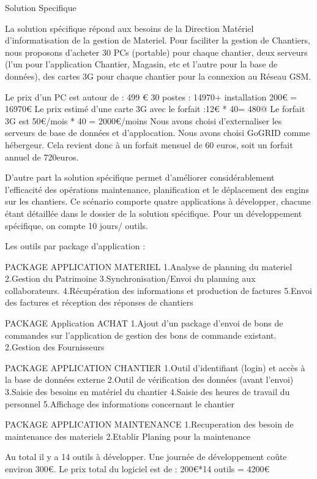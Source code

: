 Solution Specifique

La solution spécifique répond aux besoins de la Direction Matériel d'informatisation de la gestion de Materiel.
Pour faciliter la gestion de Chantiers, nous proposons d'acheter 30 PCs (portable) pour chaque chantier, 
deux serveurs (l'un pour l'application Chantier, Magasin, etc et l'autre pour la base de données), des cartes 3G
pour chaque chantier pour la connexion au Réseau GSM. 


Le prix d’un PC est autour de : 499 € 30 postes :  14970+ installation 200€ = 16970€
Le prix estimé d’une carte 3G avec le forfait :12€ * 40= 480@
Le forfait 3G est 50€/mois * 40 = 2000€/moins 
Nous avons choisi d’externaliser les serveurs de base de données et d'applocation. Nous avons choisi GoGRID  
comme hébergeur. 
Cela revient donc à un forfait mensuel de 60 euros, soit un forfait annuel de 720euros.


D'autre part la solution spécifique permet d'améliorer considérablement l'efficacité des opérations maintenance,
planification et le déplacement des engins sur les chantiers.
Ce scénario comporte quatre applications à développer, chacune étant  détaillée dans le dossier de la 
solution spécifique.
Pour un développement spécifique, on compte 10 jours/ outils.

Les outils par package d'application :

PACKAGE APPLICATION MATERIEL
1.Analyse de planning du materiel
2.Gestion du Patrimoine
3.Synchronisation/Envoi du planning aux collaborateurs.
4.Récupération des informations et production de factures
5.Envoi des factures et réception des réponses de chantiers

PACKAGE Application ACHAT
1.Ajout  d’un package d’envoi de bons de commandes sur l’application de gestion des 
bons de commande existant.
2.Gestion des Fournisseurs

PACKAGE APPLICATION CHANTIER
1.Outil d’identifiant (login) et accès à la base de données externe
2.Outil de vérification des données (avant l’envoi)
3.Saisie des besoins en matériel du chantier
4.Saisie des heures de travail du personnel
5.Affichage des informations concernant le chantier

PACKAGE APPLICATION MAINTENANCE
1.Recuperation des besoin de maintenance des materiels
2.Etablir Planing pour la maintenance

Au total il y a 14 outils à développer. Une journée de développement coûte environ 300€.
Le prix total du logiciel est de : 200€*14 outils = 4200€

